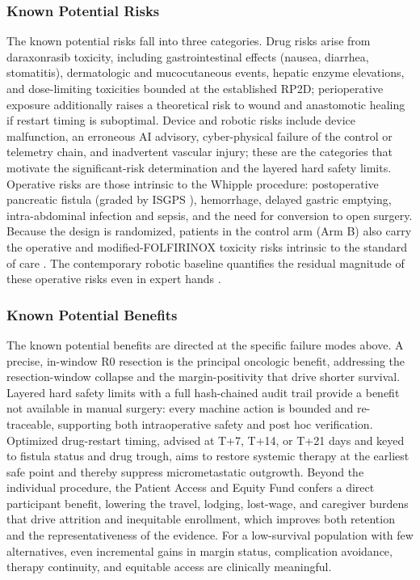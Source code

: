 \subsubsection{Known Potential Risks}

The known potential risks fall into three categories. Drug risks arise from
daraxonrasib toxicity, including gastrointestinal effects (nausea, diarrhea,
stomatitis), dermatologic and mucocutaneous events, hepatic enzyme elevations,
and dose-limiting toxicities bounded at the established RP2D; perioperative
exposure additionally raises a theoretical risk to wound and anastomotic healing
if restart timing is suboptimal. Device and robotic risks include device
malfunction, an erroneous AI advisory, cyber-physical failure of the control or
telemetry chain, and inadvertent vascular injury; these are the categories that
motivate the significant-risk determination and the layered hard safety limits.
Operative risks are those intrinsic to the Whipple procedure: postoperative
pancreatic fistula (graded by ISGPS \cite{Bassi2017}), hemorrhage, delayed gastric
emptying, intra-abdominal infection and sepsis, and the need for conversion to
open surgery. Because the design is randomized, patients in the control arm (Arm B)
also carry the operative and modified-FOLFIRINOX toxicity risks intrinsic to the
standard of care \cite{Conroy2018}. The contemporary robotic baseline quantifies
the residual magnitude of these operative risks even in expert hands
\cite{DutchCohort2025}.

\vspace{-0.2cm}

\subsubsection{Known Potential Benefits}

The known potential benefits are directed at the specific failure modes above. A
precise, in-window R0 resection is the principal oncologic benefit, addressing the
resection-window collapse and the margin-positivity that drive shorter survival.
Layered hard safety limits with a full hash-chained audit trail provide a benefit
not available in manual surgery: every machine action is bounded and re-traceable,
supporting both intraoperative safety and post hoc verification. Optimized
drug-restart timing, advised at T+7, T+14, or T+21 days and keyed to fistula
status and drug trough, aims to restore systemic therapy at the earliest safe
point and thereby suppress micrometastatic outgrowth. Beyond the individual
procedure, the Patient Access and Equity Fund confers a direct participant
benefit, lowering the travel, lodging, lost-wage, and caregiver burdens that drive
attrition and inequitable enrollment, which improves both retention and the
representativeness of the evidence. For a low-survival population with few
alternatives, even incremental gains in margin status, complication avoidance,
therapy continuity, and equitable access are clinically meaningful.

